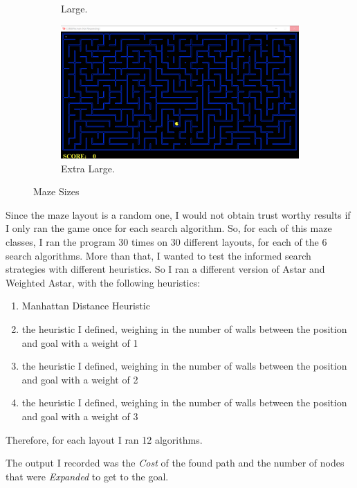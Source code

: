 \documentclass[a4paper,12pt]{report}
\begin{document}
\begin{figure}[h!]
\begin{subfigure}[b]{0.4\linewidth}
    \caption{Large.}
  \end{subfigure}
  \begin{subfigure}[b]{0.4\linewidth}
    \includegraphics[width=\linewidth]{pictures/mazeSizes/extraLarge.png}
    \caption{Extra Large.}
  \end{subfigure}
  \caption{Maze Sizes}
  \label{fig:pic3}
\end{figure}

\vspace{0.5cm}

Since the maze layout is a random one, I would not obtain trust worthy results if I only ran the game once for each search algorithm. So, for each of this maze classes, I ran the program 30 times on 30 different layouts, for each of the 6 search algorithms. More than that, I wanted to test the informed search strategies with different heuristics. So I ran a different version of Astar and Weighted Astar, with the following heuristics: 

\begin{enumerate}
\item Manhattan Distance Heuristic
\item the heuristic I defined, weighing in the number of walls between the position and goal with a weight of 1
\item the heuristic I defined, weighing in the number of walls between the position and goal with a weight of 2
\item the heuristic I defined, weighing in the number of walls between the position and goal with a weight of 3
\end{enumerate}

Therefore, for each layout I ran 12 algorithms.

The output I recorded was the \textit{Cost} of the found path and the number of nodes that were \textit{Expanded} to get to the goal.
\end{document}
